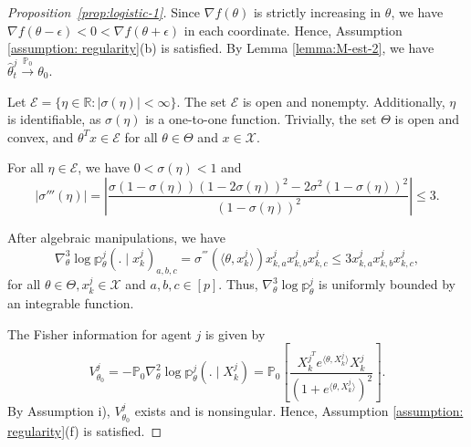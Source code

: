 \documentclass[twoside,11pt]{article}
\numberwithin{equation}{section}
\newcommand\bP{\mathbb{P}}
\newcommand\bp{\mathbb{p}}
\newcommand{\X}{\mathcal{X}}
\newcommand{\pto}{\stackrel{\bP_0}{\to}}
\begin{document}
{\begin{proof}[Proposition~\ref{prop:logistic-1}]
Since $\nabla f(\theta)$ is strictly increasing in $\theta$, we have $\nabla f(\theta - \epsilon) < 0 < \nabla f(\theta + \epsilon)$ in each coordinate. Hence, Assumption \ref{assumption: regularity}(b) is satisfied. By Lemma \ref{lemma:M-est-2}, we have $\hat \theta_t^j \pto \theta_0 $.

 Let $\mathcal{E} = \{\eta \in \mathbb{R} : |\sigma(\eta)| < \infty \}$. The set $\mathcal{E}$ is open and nonempty. Additionally, $\eta$ is identifiable, as $\sigma(\eta)$ is a one-to-one function. Trivially, the set $\Theta$ is open and convex, and $\theta^T x \in \mathcal{E}$ for all $\theta \in \Theta$ and $x \in \X$.

 For all $\eta \in \mathcal{E}$, we have $0 < \sigma(\eta) < 1$ and
\begin{equation*}
    |\sigma'''(\eta)| = |\frac{\sigma(1 - \sigma(\eta))(1 - 2\sigma(\eta))^2 - 2\sigma^2(1-\sigma(\eta))^2}{(1 - \sigma(\eta))^2}| \leq 3. 
\end{equation*}

After algebraic manipulations, we have
\begin{equation*}
    \nabla_\theta^3 \log\bp_\theta^j(. \mid x_k^j)_{a,b, c} = \sigma^{'''}(\langle \theta, x_k^j \rangle) x_{k,a}^j x_{k,b}^j x_{k,c}^j \leq 3 x_{k,a}^j x_{k,b}^j x_{k,c}^j, 
\end{equation*}
for all $\theta \in \Theta, x_k^j \in \X$ and $a, b,c \in [p]$.  Thus, $\nabla_\theta^3 \log \bp_\theta^j$ is uniformly bounded by an integrable function. 

The Fisher information for agent $j$ is given by
\begin{equation*}
    V_{\theta_0}^j = - \bP_0 \nabla_\theta^2 \log \bp_\theta^j(. \mid X_k^j) = \bP_0  \left[\frac{X_k^{j^T} e^{\langle \theta,  X_k^j \rangle} X_k^j}{\left(1 + e^{\langle \theta,  X_k^j \rangle} \right)^2} \right].  
\end{equation*}
By Assumption i), $V_{\theta_0}^j$ exists and is nonsingular. Hence, Assumption \ref{assumption: regularity}(f) is satisfied. 


\end{proof}}
\end{document}
